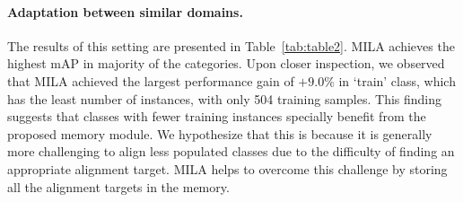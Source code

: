 \documentclass{bmvc2k}
\begin{document}
\paragraph{Adaptation between similar domains.}
The results of this setting are presented in Table~\ref{tab:table2}. MILA achieves the highest mAP in majority of the categories. Upon closer inspection, we observed that MILA achieved the largest performance gain of $+9.0\%$ in `train' class, which has the least number of instances, with only 504 training samples. This finding suggests that classes with fewer training instances specially benefit from the proposed memory module. We hypothesize that this is because it is generally more challenging to align less populated classes due to the difficulty of finding an appropriate alignment target. MILA helps to overcome this challenge by storing all the alignment targets in the memory.
\end{document}
